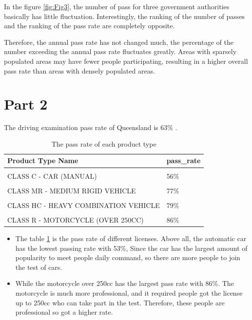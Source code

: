 \documentclass[11pt,a4paper,]{article}
\begin{document}
In the figure \ref{fig:Fig3}, the number of pass for three government authorities basically has little fluctuation. Interestingly, the ranking of the number of passes and the ranking of the pass rate are completely opposite.

Therefore, the annual pass rate has not changed much, the percentage of the number exceeding the annual pass rate fluctuates greatly. Areas with sparsely populated areas may have fewer people participating, resulting in a higher overall pass rate than areas with densely populated areas.

\section*{Part 2}

The driving examination pass rate of Queensland is 63\% .

\begin{table}[!h]

\caption{\label{tab:passrate}The pass rate of each product type}
\centering
\begin{tabular}[t]{ll}
\toprule
Product Type Name & pass\_rate\\
\midrule
\cellcolor{gray!6}{CLASS CA - CAR (AUTOMATIC)} & \cellcolor{gray!6}{53\%}\\
CLASS C - CAR (MANUAL) & 56\%\\
\cellcolor{gray!6}{CLASS HR - HEAVY RIGID VEHICLE} & \cellcolor{gray!6}{70\%}\\
CLASS MR - MEDIUM RIGID VEHICLE & 77\%\\
\cellcolor{gray!6}{CLASS RE - MOTORCYCLE (UP TO 250CC} & \cellcolor{gray!6}{77\%}\\
\addlinespace
CLASS HC - HEAVY COMBINATION VEHICLE & 79\%\\
\cellcolor{gray!6}{CLASS LR - LIGHT RIGID VEHICLE} & \cellcolor{gray!6}{83\%}\\
CLASS R - MOTORCYCLE (OVER 250CC) & 86\%\\
\bottomrule
\end{tabular}
\end{table}

\begin{itemize}
\item
  The table \ref{tab:passrate} is the pass rate of different licenses. Above all, the automatic car has the lowest passing rate with 53\%, Since the car has the largest amount of popularity to meet people daily command, so there are more people to join the test of cars.
\item
  While the motorcycle over 250cc has the largest pass rate with 86\%. The motorcycle is much more professional, and it required people got the license up to 250cc who can take part in the test. Therefore, these people are professional so got a higher rate.
\end{itemize}
\end{document}
